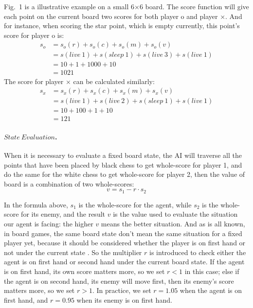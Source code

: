 \documentclass[final]{cvpr}
\newcommand{\vnudge}{\vspace*{-.1in}}
\newcommand{\mypara}[1]{\paragraph{#1.}}
\begin{document}
\noindent Fig.\ 1 is a illustrative example on a small 6×6 board. 
%
The score function will give each point on the current board two scores for both player o and player ×.
%
And for instance, when scoring the star point, which is empty currently, this point's score for player o is: 
\begin{align*}
    s_o &= s_o(r) + s_o(c) + s_o(m) + s_o(v) \\
    &= s(live\ 1)+s(sleep\ 1)+s(live\ 3)+s(live\ 1) \\
    &= 10 + 1 + 1000 + 10 \\
    &= 1021
\end{align*}
The score for player × can be calculated similarly: 
\begin{align*}
    s_x &= s_x(r) + s_x(c) + s_x(m) + s_x(v) \\
    &= s(live\ 1)+s(live\ 2)+s(sleep\ 1)+s(live\ 1) \\
    &= 10 + 100 + 1 + 10 \\
    &= 121
\end{align*}



\vnudge
\mypara{$State\ Evaluation$} When it is necessary to evaluate a fixed board state, the AI will traverse all the points that have been placed by black chess to get whole-score for player 1, and do the same for the white chess to get whole-score for player 2, then the value of board is a combination of two whole-scores:
$$v = s_1 - r\cdot s_2$$
%
\par In the formula above, $s_1$ is the whole-score for the agent,  while $s_2$ is the whole-score for its enemy, and the result $v$ is the value used to evaluate the situation our agent is facing: the higher $v$ means the better situation.
%
And as is all known, in board games, the same board state don't mean the same situation for a fixed player yet, because it should be considered whether the player is on first hand or not under the current state .
%
So the multiplier $r$ is introduced to check either the agent is on first hand or second hand under the current board state.
%
If the agent is on first hand, its own score matters more, so we set $r < 1$ in this case; else if the agent is on second hand, its enemy will move first, then its enemy's score matters more, so we set $r > 1$.
%
In practice, we set $r = 1.05$ when the agent is on first hand, and $r = 0.95$ when its enemy is on first hand.

\end{document}
